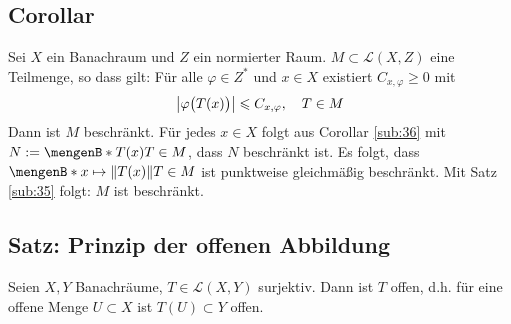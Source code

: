 \subsection{Corollar} %
\label{sub:37}
Sei $X$ ein Banachraum und $Z$ ein normierter Raum. $M \subset \mathcal{L}(X,Z)$ eine Teilmenge, so dass gilt: Für alle $\varphi \in Z^*$ und $x \in X$ existiert $C_{x,\varphi} \ge 0$
mit
\[
	\abs*{\varphi \enbrace[\big]{T(x)}} \le C_{x,\varphi}, \quad T \in M
\]
Dann ist $M$ beschränkt.
Für jedes $x \in X$ folgt aus Corollar \ref{sub:36} mit $N := \set[T(x)]{T \in M}$, dass $N$ beschränkt ist. Es folgt, dass $ \set[x \mapsto \norm{T(x)} ]{T \in M}$ ist 
punktweise gleichmäßig beschränkt. Mit Satz \ref{sub:35} folgt: $M$ ist beschränkt. \bewende

\subsection{Satz: Prinzip der offenen Abbildung} %
\label{sub:38}
Seien $X,Y$ Banachräume, $T \in \mathcal{L}(X,Y)$ surjektiv. Dann ist $T$ offen, d.h. für eine offene Menge $U \subset X$ ist $T(U) \subset Y$ offen.

